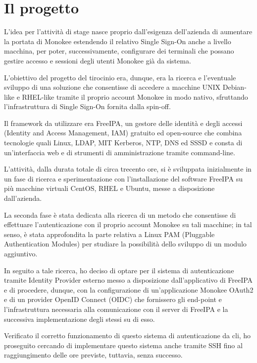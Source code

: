 \section{Il progetto}

L'idea per l'attività di stage nasce proprio dall'esigenza dell'azienda di aumentare la portata di Monokee estendendo il 
relativo Single Sign-On anche a livello macchina, per poter, successivamente, configurare dei terminali
che possano gestire accesso e sessioni degli utenti Monokee già da sistema.

L'obiettivo del progetto del tirocinio era, dunque, era la ricerca e l'eventuale sviluppo di una soluzione che consentisse
di accedere a macchine UNIX Debian-like e RHEL-like tramite il proprio account Monokee in modo nativo, sfruttando l'infrastruttura
di Single Sign-On fornita dalla spin-off.

Il framework da utilizzare era FreeIPA, un gestore delle identità e degli accessi (Identity and Access Management, IAM)
gratuito ed open-source che combina tecnologie quali Linux, LDAP, MIT Kerberos, NTP, DNS ed SSSD e consta di un'interfaccia web
e di strumenti di amministrazione tramite command-line. 

L'attività, dalla durata totale di circa trecento ore, si è sviluppata inizialmente in un fase di ricerca e sperimentazione
con l'installazione del software FreeIPA su più macchine virtuali CentOS, RHEL e Ubuntu,
messe a disposizione dall'azienda.

La seconda fase è stata dedicata alla ricerca di un metodo che consentisse di effettuare l'autenticazione con il
proprio account Monokee su tali macchine; in tal senso, è stata approfondita la parte relativa a 
Linux PAM (Pluggable Authentication Modules) per studiare la possibilità dello sviluppo di un modulo aggiuntivo. 

In seguito a tale ricerca, ho deciso di optare per il sistema di autenticazione tramite Identity Provider esterno
messo a disposizione dall'applicativo di FreeIPA e di procedere, dunque, con la configurazione di un'applicazione
Monokee OAuth2 e di un provider OpenID Connect (OIDC) che fornissero gli end-point e l'infrastruttura 
necessaria alla comunicazione con il server di FreeIPA e la successiva implementazione degli stessi su di esso. 

Verificato il corretto funzionamento di questo sistema di autenticazione da \gls{cli}, ho proseguito cercando di implementare questo sistema anche tramite SSH fino al raggiungimento delle ore previste, tuttavia, senza successo.



